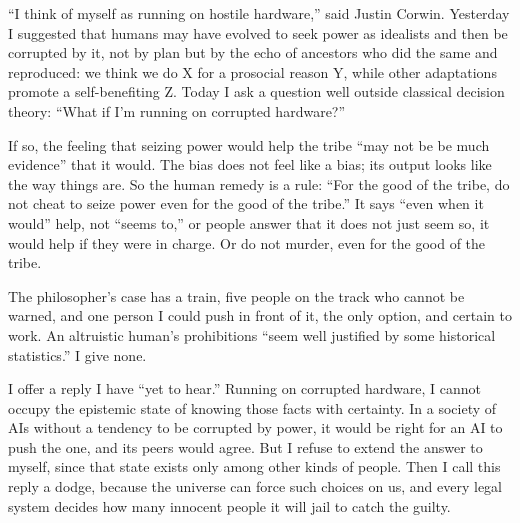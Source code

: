 
``I think of myself as running on hostile hardware,'' said Justin Corwin. Yesterday I suggested that humans may have evolved to seek power as idealists and then be corrupted by it, not by plan but by the echo of ancestors who did the same and reproduced: we think we do X for a prosocial reason Y, while other adaptations promote a self-benefiting Z.  Today I ask a question well outside classical decision theory: ``What if I'm running on corrupted hardware?''

If so, the feeling that seizing power would help the tribe ``may not be be much evidence'' that it would. The bias does not feel like a bias; its output looks like the way things are. So the human remedy is a rule: ``For the good of the tribe, do not cheat to seize power even for the good of the tribe.'' It says ``even when it would'' help, not ``seems to,'' or people answer that it does not just seem so, it would help if they were in charge. Or do not murder, even for the good of the tribe. 

The philosopher's case has a train, five people on the track who cannot be warned, and one person I could push in front of it, the only option, and certain to work. An altruistic human's prohibitions ``seem well justified by some historical statistics.'' I give none.

I offer a reply I have ``yet to hear.'' Running on corrupted hardware, I cannot occupy the epistemic state of knowing those facts with certainty. In a society of AIs without a tendency to be corrupted by power, it would be right for an AI to push the one, and its peers would agree. But I refuse to extend the answer to myself, since that state exists only among other kinds of people.  Then I call this reply a dodge, because the universe can force such choices on us, and every legal system decides how many innocent people it will jail to catch the guilty.

